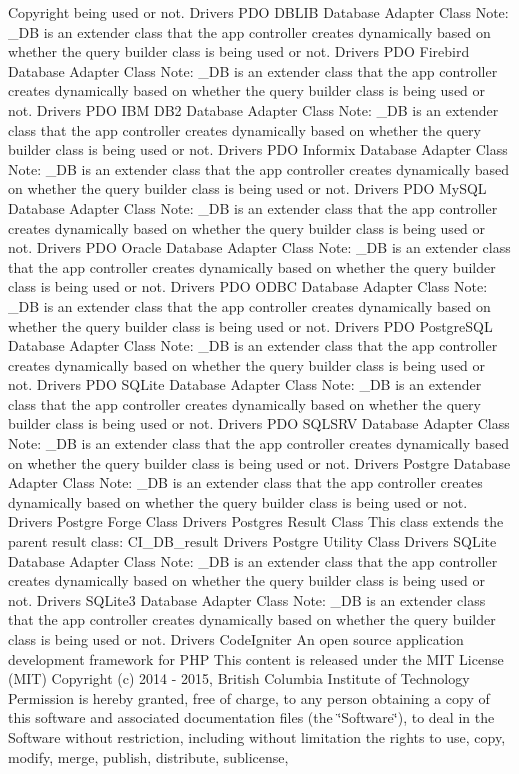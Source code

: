 \begin{DoxyCopyright}{Copyright}
being used or not.  Drivers P\+D\+O D\+B\+L\+I\+B Database Adapter Class Note\+: \+\_\+\+D\+B is an extender class that the app controller creates dynamically based on whether the query builder class is being used or not.  Drivers P\+D\+O Firebird Database Adapter Class Note\+: \+\_\+\+D\+B is an extender class that the app controller creates dynamically based on whether the query builder class is being used or not.  Drivers P\+D\+O I\+B\+M D\+B2 Database Adapter Class Note\+: \+\_\+\+D\+B is an extender class that the app controller creates dynamically based on whether the query builder class is being used or not.  Drivers P\+D\+O Informix Database Adapter Class Note\+: \+\_\+\+D\+B is an extender class that the app controller creates dynamically based on whether the query builder class is being used or not.  Drivers P\+D\+O My\+S\+Q\+L Database Adapter Class Note\+: \+\_\+\+D\+B is an extender class that the app controller creates dynamically based on whether the query builder class is being used or not.  Drivers P\+D\+O Oracle Database Adapter Class Note\+: \+\_\+\+D\+B is an extender class that the app controller creates dynamically based on whether the query builder class is being used or not.  Drivers P\+D\+O O\+D\+B\+C Database Adapter Class Note\+: \+\_\+\+D\+B is an extender class that the app controller creates dynamically based on whether the query builder class is being used or not.  Drivers P\+D\+O Postgre\+S\+Q\+L Database Adapter Class Note\+: \+\_\+\+D\+B is an extender class that the app controller creates dynamically based on whether the query builder class is being used or not.  Drivers P\+D\+O S\+Q\+Lite Database Adapter Class Note\+: \+\_\+\+D\+B is an extender class that the app controller creates dynamically based on whether the query builder class is being used or not.  Drivers P\+D\+O S\+Q\+L\+S\+R\+V Database Adapter Class Note\+: \+\_\+\+D\+B is an extender class that the app controller creates dynamically based on whether the query builder class is being used or not.  Drivers Postgre Database Adapter Class Note\+: \+\_\+\+D\+B is an extender class that the app controller creates dynamically based on whether the query builder class is being used or not.  Drivers Postgre Forge Class  Drivers Postgres Result Class This class extends the parent result class\+: C\+I\+\_\+\+D\+B\+\_\+result  Drivers Postgre Utility Class  Drivers S\+Q\+Lite Database Adapter Class Note\+: \+\_\+\+D\+B is an extender class that the app controller creates dynamically based on whether the query builder class is being used or not.  Drivers S\+Q\+Lite3 Database Adapter Class Note\+: \+\_\+\+D\+B is an extender class that the app controller creates dynamically based on whether the query builder class is being used or not.  Drivers Code\+Igniter An open source application development framework for P\+H\+P This content is released under the M\+I\+T License (M\+I\+T) Copyright (c) 2014 -\/ 2015, British Columbia Institute of Technology Permission is hereby granted, free of charge, to any person obtaining a copy of this software and associated documentation files (the \char`\"{}\+Software\char`\"{}), to deal in the Software without restriction, including without limitation the rights to use, copy, modify, merge, publish, distribute, sublicense, 
\end{DoxyCopyright}
